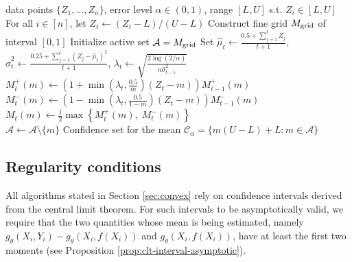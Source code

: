 \documentclass[10pt]{article}
\newcommand{\C}{\mathcal{C}}
\begin{document}
 

\begin{algorithm}[H]
\caption{\texttt{MeanCI} (see Proposition~\ref{prop:wsr-interval-iid})}
\label{alg:meanCI}
\begin{algorithmic}[1]
\Require data points $\{Z_1,\dots,Z_n\}$, error level $\alpha \in(0,1)$, range $[L,U]$ s.t. $Z_i\in[L,U]$ 
\State For all $i\in[n]$, let $Z_i \leftarrow (Z_i - L)/(U-L)$ 
\State Construct fine grid $M_{\rm grid}$ of interval $[0,1]$
\State Initialize active set $\mathcal A = M_{\rm grid}$
\State Set $\hat{\mu}_t \leftarrow \frac{0.5 + \sum_{j=1}^t Z_{j}}{t+1}$, $\hat{\sigma}_t^2 \leftarrow \frac{0.25 + \sum_{j=1}^t (Z_{j} - \hat{\mu}_t)^2}{t + 1}$, $\lambda_t \leftarrow \sqrt{\frac{2\log(2/\alpha)}{n\hat{\sigma}^2_{t-1}}}$
\State $M_t^+(m)\leftarrow \left(1+\min\left(\lambda_t, \frac{0.5}{m}\right)(Z_{t} - m)\right) M^+_{t-1}(m)$
\State $M_t^-(m) \leftarrow \left(1-\min\left(\lambda_t, \frac{0.5}{1-m}\right)(Z_{t} - m)\right) M^-_{t-1}(m)$
\State $M_t(m) \leftarrow \frac{1}{2} \max\left\{M_t^+(m), \; M_t^-(m)   \right\}$ 
\\
\qquad \qquad \quad  $\mathcal A \leftarrow \mathcal A \setminus \{m\}$ 
\EndIf
\EndFor
\EndFor
\Ensure 
Confidence set for the mean $\C_\alpha = \{m(U-L) + L: m\in \mathcal A\}$
\end{algorithmic}
\end{algorithm}




\subsection{Regularity conditions}
\label{app:regularity-conditions}

All algorithms stated in Section \ref{sec:convex} rely on confidence intervals derived from the central limit theorem. For such intervals to be asymptotically valid, we require that the two quantities whose mean is being estimated, namely $g_\theta(X_i,Y_i) - g_\theta(X_i,f(X_i))$ and $g_\theta(X_i,f(X_i))$, have at least the first two moments (see Proposition \ref{prop:clt-interval-asymptotic}).
\end{document}
